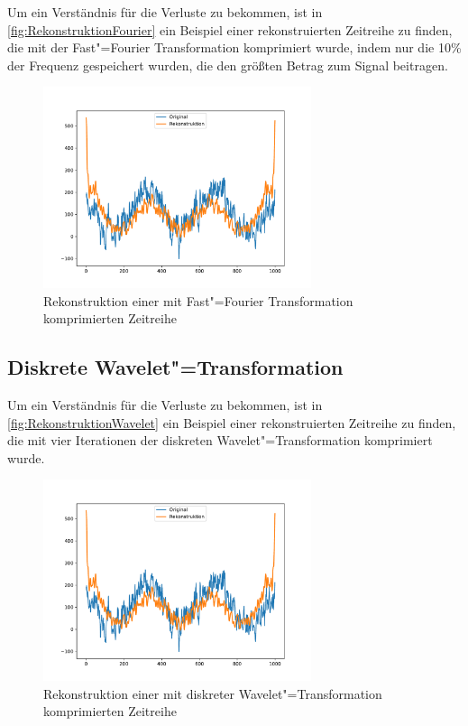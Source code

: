 Um ein Verständnis für die Verluste zu bekommen, ist in \autoref{fig:RekonstruktionFourier} ein Beispiel einer rekonstruierten Zeitreihe zu finden, die mit der Fast"=Fourier Transformation komprimiert wurde, indem nur die 10\% der Frequenz gespeichert wurden, die den größten Betrag zum Signal beitragen.
\begin{figure}[bth] 
  \centering
  \includegraphics[width=0.7\textwidth]{Graphics/RekonstruktionFourier.pdf}
  \caption{Rekonstruktion einer mit Fast"=Fourier Transformation komprimierten Zeitreihe}
  \label{fig:RekonstruktionFourier}
\end{figure}

\subsection{Diskrete Wavelet"=Transformation}
\blindtext

Um ein Verständnis für die Verluste zu bekommen, ist in \autoref{fig:RekonstruktionWavelet} ein Beispiel einer rekonstruierten Zeitreihe zu finden, die mit vier Iterationen der diskreten Wavelet"=Transformation komprimiert wurde.
\begin{figure}[bth] 
  \centering
  \includegraphics[width=0.7\textwidth]{Graphics/RekonstruktionFourier.pdf}
  \caption{Rekonstruktion einer mit diskreter Wavelet"=Transformation komprimierten Zeitreihe}
  \label{fig:RekonstruktionWavelet}
\end{figure}